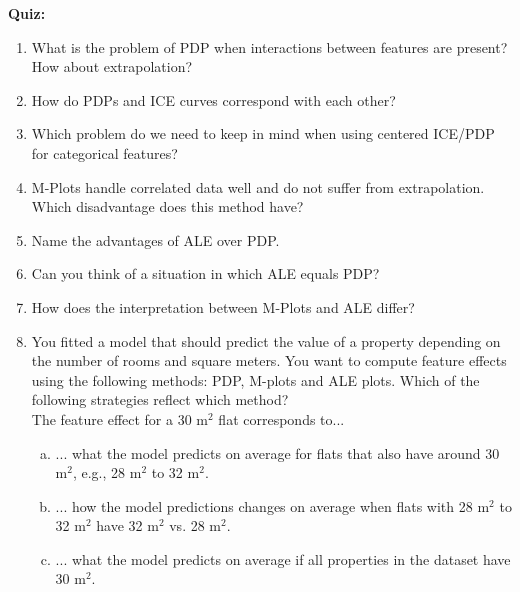 \textbf{Quiz:}
\begin{enumerate}
        
        \item What is the problem of PDP when interactions between features are present? How about extrapolation?
        \item How do PDPs and ICE curves correspond with each other?
        \item Which problem do we need to keep in mind when using centered ICE/PDP for categorical features? 
        \item M-Plots handle correlated data well and do not suffer from extrapolation. Which disadvantage does this method have?
        \item Name the advantages of ALE over PDP.
        \item Can you think of a situation in which ALE equals PDP?
        \item How does the interpretation between M-Plots and ALE differ?


\item You fitted a model that should predict the value of a property depending on 
    the number of rooms and square meters. 
    You want to compute feature effects using the following methods: 
    PDP, M-plots and ALE plots. 
    Which of the following strategies reflect which method? \\
    The feature effect for a 30 m$^2$ flat corresponds to... 
\begin{enumerate}[a)]
  \item ... what the model predicts on average for flats that also have around 30 m$^2$, e.g., 28 m$^2$ to 32 m$^2$. 
  \item ... how the model predictions changes on average when flats with 28 m$^2$ to 32 m$^2$ have 32 m$^2$ vs. 28 m$^2$. 
  \item ... what the model predicts on average if all properties in the dataset have 30 m$^2$. 
\end{enumerate}

\end{enumerate}